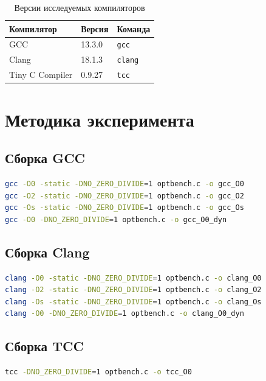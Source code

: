 \documentclass[12pt,a4paper]{article}
\begin{document}
\begin{table}[H]
\centering
\caption{Версии исследуемых компиляторов}
\begin{tabular}{lll}
\toprule
Компилятор & Версия & Команда \\
\midrule
GCC & 13.3.0 & \texttt{gcc} \\
Clang & 18.1.3 & \texttt{clang} \\
Tiny C Compiler & 0.9.27 & \texttt{tcc} \\
\bottomrule
\end{tabular}
\end{table}

\section{Методика эксперимента}

\subsection{Сборка GCC}

\begin{lstlisting}[language=bash,caption={Сборка GCC}]
gcc -O0 -static -DNO_ZERO_DIVIDE=1 optbench.c -o gcc_O0
gcc -O2 -static -DNO_ZERO_DIVIDE=1 optbench.c -o gcc_O2
gcc -Os -static -DNO_ZERO_DIVIDE=1 optbench.c -o gcc_Os
gcc -O0 -DNO_ZERO_DIVIDE=1 optbench.c -o gcc_O0_dyn
\end{lstlisting}

\subsection{Сборка Clang}

\begin{lstlisting}[language=bash,caption={Сборка Clang}]
clang -O0 -static -DNO_ZERO_DIVIDE=1 optbench.c -o clang_O0
clang -O2 -static -DNO_ZERO_DIVIDE=1 optbench.c -o clang_O2
clang -Os -static -DNO_ZERO_DIVIDE=1 optbench.c -o clang_Os
clang -O0 -DNO_ZERO_DIVIDE=1 optbench.c -o clang_O0_dyn
\end{lstlisting}

\subsection{Сборка TCC}

\begin{lstlisting}[language=bash,caption={Сборка TCC}]
tcc -DNO_ZERO_DIVIDE=1 optbench.c -o tcc_O0
\end{lstlisting}
\end{document}
